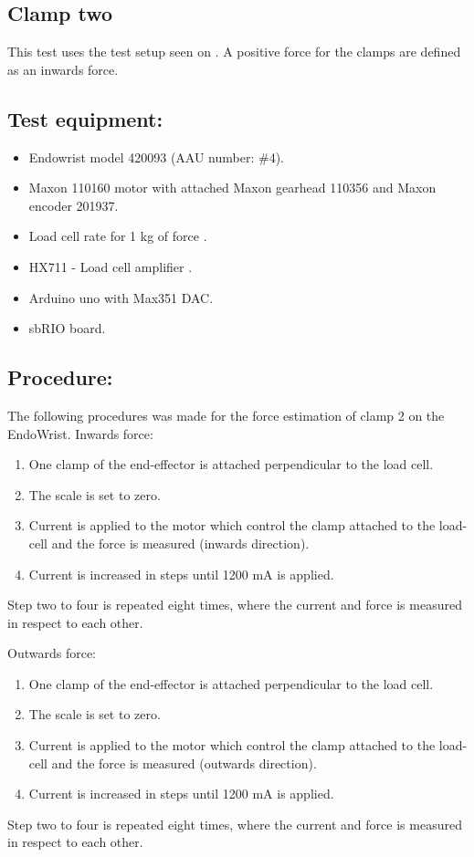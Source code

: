 \subsection{Clamp two} %
This test uses the test setup seen on . A positive force for the clamps are defined as an inwards force.

\subsection*{Test equipment:}
\begin{itemize}
\item Endowrist model 420093 (AAU number: \#4).
\item Maxon 110160 motor with attached Maxon gearhead 110356 and Maxon encoder 201937.
\item Load cell rate for 1 kg of force \cite{Load_cell_1kg}.
\item HX711 - Load cell amplifier \cite{HX711}.
\item Arduino uno with Max351 DAC.
\item sbRIO board.
\end{itemize}

\subsection*{Procedure:}
The following procedures was made for the force estimation of clamp 2 on the EndoWrist. 
Inwards force:
\begin{enumerate}
\item One clamp of the end-effector is attached perpendicular to the load cell. 
\item The scale is set to zero.
\item Current is applied to the motor which control the clamp attached to the load-cell and the force is measured (inwards direction).
\item Current is increased in steps until 1200 mA is applied.
\end{enumerate}
Step two to four is repeated eight times, where the current and force is measured in respect to each other. 

Outwards force:
\begin{enumerate}
\item One clamp of the end-effector is attached perpendicular to the load cell. 
\item The scale is set to zero.
\item Current is applied to the motor which control the clamp attached to the load-cell and the force is measured (outwards direction).
\item Current is increased in steps until 1200 mA is applied.
\end{enumerate}
Step two to four is repeated eight times, where the current and force is measured in respect to each other. 

